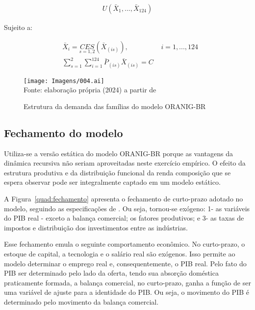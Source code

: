 \begin{align*}
	U(\bar{X}_1, ... , \bar{X}_{124})
\end{align*}

Sujeito a:

\begin{align}
	&\bar{X}_i = \underset{s = 1, 2}{CES} (\bar{X}_{(is)}), \hspace{2cm} i = 1, ... , 124 \\
	&\sum_{s = 1}^{2} \sum_{i = 1}^{124} \bar{P}_{(is)} \bar{X}_{(is)} = C
\end{align}

\begin{landscape}
	\begin{figure}
		\centering
		\caption{Estrutura da demanda das famílias do modelo ORANIG-BR} \label{fig:estrutura_familia}
		\texttt{[image: Imagens/004.ai]}
		\footnotesize \\
		Fonte: elaboração própria (2024) a partir de \textcite{horridge00}
	\end{figure}
\end{landscape}

\subsection{Fechamento do modelo} \label{subsec:fechamento}

Utiliza-se a versão estática do modelo ORANIG-BR porque as vantagens da dinâmica recursiva não seriam aproveitadas neste exercício empírico. O efeito da estrutura produtiva e da distribuição funcional da renda composição que se espera observar pode ser integralmente captado em um modelo estático.

A Figura~\ref{quad:fechamento} apresenta o fechamento de curto-prazo adotado no modelo, seguindo as especificações de \textcite{horridge03}. Ou seja, tornou-se exógeno: 1- as variáveis do PIB real - exceto a balança comercial; os fatores produtivos; e 3- as taxas de impostos e distribuição dos investimentos entre as indústrias.

Esse fechamento emula o seguinte comportamento econômico. No curto-prazo, o estoque de capital, a tecnologia e o salário real são exógenos. Isso permite ao modelo determinar o emprego real e, consequentemente, o PIB real. Pelo fato do PIB ser determinado pelo lado da oferta, tendo sua absorção doméstica praticamente formada, a balança comercial, no curto-prazo, ganha a função de ser uma variável de ajuste para a identidade do PIB. Ou seja, o movimento do PIB é determinado pelo movimento da balança comercial.

